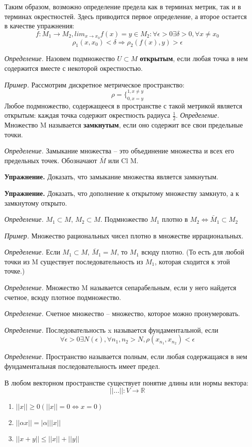\documentclass[12pt]{article}
\newcommand{\example}{{\itshape Пример. }}
\newcommand{\equals}{\Leftrightarrow}
\newcommand{\defi}{{\itshape Определение. }}
\newcommand{\exc}{{\bfseries Упражнение. }}
\renewcommand{\leq}{\leqslant}
\renewcommand{\geq}{\geqslant}
\begin{document}
	Таким образом, возможно определение предела как в терминах метрик, так и в терминах окрестностей. Здесь приводится первое определение,
	а второе остается в качестве упражнения:
	$$f : M_1 \rightarrow M_2, lim_{x \rightarrow x_0} f(x) = y \in M_2 : \forall \epsilon > 0 \exists \delta > 0, \forall x \neq x_0$$
	$$\rho_1(x, x_0) < \delta \Rightarrow \rho_2(f(x), y) > \epsilon$$
	
	\defi Назовем подмножество $U \subset M$ \textbf{открытым}, если любая точка в нем содержится вместе с некоторой окрестностью.
	
	\example Рассмотрим дискретное метрическое пространство:
	$$\rho = \{^{1, x \neq y}_{0, x = y}$$
	Любое подмножество, содержащееся в пространстве с такой метрикой является открытым: каждая точка содержит окрестность радиуса 
	$\frac{1}{2}$.
	\defi Множество M называется \textbf{замкнутым}, если оно содержит все свои предельные точки.
	
	\defi Замыкание множества -- это объединение множества и всех его предельных точек. Обозначают $\bar{M}$ или Cl M.
	
	\exc Доказать, что замыкание множества является замкнутым.
	
	\exc Доказать, что дополнение к открытому множеству замкнуто, а к замкнутому открыто.
	
	\defi $M_1 \subset M$, $M_2 \subset M$. Подмножество $M_1$ плотно в $M_2 \equals \bar{M}_1 \subset M_2$
	
	\example Множество рациональных чисел плотно в множестве иррациональных.
	
	\defi Если $M_1 \subset M$, $\bar{M}_1 = M$, то $M_1$ всюду плотно. (То есть для любой точки из M существует последовательность
	из $M_1$, которая сходится к этой точке.)
	
	\defi Множество M называется сепарабельным, если у него найдется счетное, всюду плотное подмножество.
	
	\defi Счетное множество -- множество, которое можно пронумеровать.
	
	\defi Последовательность x называется фундаментальной, если
	$$\forall \epsilon > 0 \exists N(\epsilon), \forall n_1, n_2 > N, \rho(x_{n_1}, x_{n_2}) < \epsilon$$
	
	\defi Пространство называется полным, если любая содержащаяся в нем фундаментальная последовательность имеет предел.
	
	В любом векторном пространстве существует понятие длины или нормы вектора:
	$$||...|| : V \rightarrow \mathbb{R}$$
	\begin{enumerate}
		\item $||x|| \geq 0 (||x|| = 0 \equals x = 0)$
		\item $||\alpha x|| = |\alpha| ||x||$
		\item $||x + y|| \leq ||x|| + ||y||$
	\end{enumerate}
	
\end{document}
